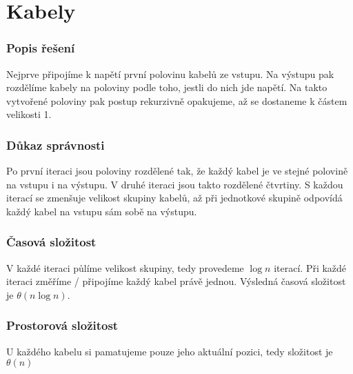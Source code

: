 \documentclass[11pt,a4paper]{article}
\begin{document}
\part*{Kabely}
\section{Popis řešení}
Nejprve připojíme k napětí první polovinu kabelů ze vstupu. Na výstupu pak rozdělíme kabely na poloviny podle toho, jestli do nich jde napětí. Na takto vytvořené poloviny pak postup rekurzivně opakujeme, až se dostaneme k částem velikosti 1.

\section{Důkaz správnosti}
Po první iteraci jsou poloviny rozdělené tak, že každý kabel je ve stejné polovině na vstupu i na výstupu. V druhé iteraci jsou takto rozdělené čtvrtiny. S každou iterací se zmenšuje velikost skupiny kabelů, až při jednotkové skupině odpovídá každý kabel na vstupu sám sobě na výstupu. 

\section{Časová složitost}
V každé iteraci půlíme velikost skupiny, tedy provedeme $\log n$ iterací. Při každé iteraci změříme / připojíme každý kabel právě jednou. Výsledná časová složitost je $\theta (n\log n)$. 
\section{Prostorová složitost}
U každého kabelu si pamatujeme pouze jeho aktuální pozici, tedy složitost je $\theta (n)$
\end{document}
